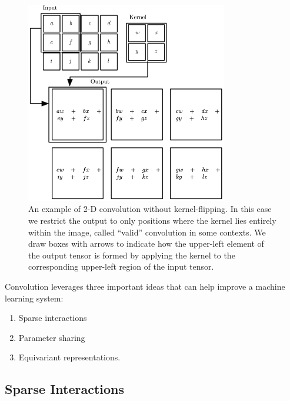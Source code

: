\documentclass{report}
\begin{document}
\begin{figure}[ht]
	\includegraphics[width=250pt]{27}
	\centering
	\caption{An example of 2-D convolution without kernel-ﬂipping. In this case we restrict the output to only positions where the kernel lies entirely within the image, called “valid” convolution in some contexts. We draw boxes with arrows to indicate how the upper-left element of the output tensor is formed by applying the kernel to the corresponding upper-left region of the input tensor.}
\end{figure}

Convolution leverages three important ideas that can help improve a machine learning system: 
\begin{enumerate}
	\item Sparse interactions
	\item Parameter sharing
	\item Equivariant representations.
\end{enumerate}

\subsection{Sparse Interactions}
\end{document}
